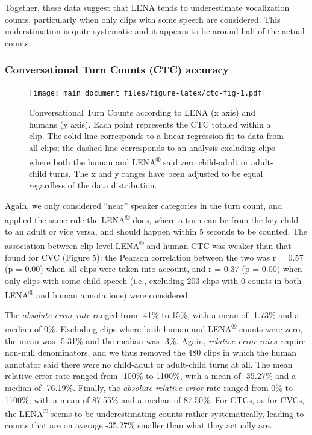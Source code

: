 \documentclass[english,table,man,floatsintext]{apa6}
\begin{document}
Together, these data suggest that LENA tends to underestimate vocalization counts, particularly when only clips with some speech are considered. This understimation is quite systematic and it appears to be around half of the actual counts.

\hypertarget{conversational-turn-counts-ctc-accuracy}{%
\subsubsection{Conversational Turn Counts (CTC) accuracy}\label{conversational-turn-counts-ctc-accuracy}}

\begin{figure}
\centering
\texttt{[image: main\_document\_files/figure-latex/ctc-fig-1.pdf]}
\caption{\label{fig:ctc-fig}Conversational Turn Counts according to LENA (x axis) and humans (y axis). Each point represents the CTC totaled within a clip. The solid line corresponds to a linear regression fit to data from all clips; the dashed line corresponds to an analysis excluding clips where both the human and LENA\textsuperscript{®} said zero child-adult or adult-child turns. The x and y ranges have been adjusted to be equal regardless of the data distribution.}
\end{figure}

Again, we only considered \enquote{near} speaker categories in the turn count, and applied the same rule the LENA\textsuperscript{®} does, where a turn can be from the key child to an adult or vice versa, and should happen within 5 seconds to be counted. The association between clip-level LENA\textsuperscript{®} and human CTC was weaker than that found for CVC (Figure 5): the Pearson correlation between the two was r = 0.57 (p = 0.00) when all clips were taken into account, and r = 0.37 (p = 0.00) when only clips with some child speech (i.e., excluding 203 clips with 0 counts in both LENA\textsuperscript{®} and human annotations) were considered.

The \emph{absolute error rate} ranged from -41\% to 15\%, with a mean of -1.73\% and a median of 0\%. Excluding clips where both human and LENA\textsuperscript{®} counts were zero,
the mean was -5.31\% and the median was -3\%. Again, \emph{relative error rates} require non-null denominators, and we thus removed the 480 clips in which the human annotator said there were no child-adult or adult-child turns at all. The mean relative error rate ranged from -100\% to 1100\%, with a mean of -35.27\% and a median of -76.19\%. Finally, the \emph{absolute relative error} rate ranged from 0\% to 1100\%, with a mean of 87.55\% and a median of 87.50\%. For CTCs, as for CVCs, the LENA\textsuperscript{®} seems to be underestimating counts rather systematically, leading to counts that are on average -35.27\% smaller than what they actually are.
\end{document}
